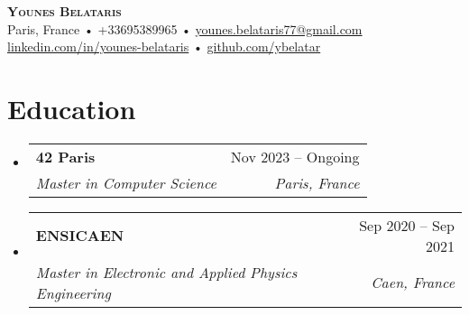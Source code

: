 \documentclass[letterpaper,11pt]{article}
\makeatletter
\newcommand{\resumeItem}[1]{
  \item\small{
    {#1 \vspace{-2pt}}
  }
}
\newcommand{\resumeSubheading}[4]{
  \vspace{-2pt}\item
    \begin{tabular*}{0.97\textwidth}[t]{l@{\extracolsep{\fill}}r}
      \textbf{#1} & #2 \\
      \textit{\small#3} & \textit{\small #4} \\
    \end{tabular*}\vspace{-7pt}
}
\newcommand{\resumeSubHeadingListStart}{\begin{itemize}[leftmargin=0.15in, label={}]}
\newcommand{\resumeSubHeadingListEnd}{\end{itemize}}
\newcommand{\resumeItemListStart}{\begin{itemize}}
\newcommand{\resumeItemListEnd}{\end{itemize}\vspace{-5pt}}
\makeatother
\begin{document}

\begin{center}
    \textbf{\Huge \scshape Younes Belataris} \\ \vspace{6pt}
    \small Paris, France  \hspace{2mm}•\hspace{2mm}   +33695389965   \hspace{2mm}•\hspace{2mm}   \href{younes.belataris77@gmail.com}{{younes.belataris77@gmail.com}} \\
    \href{https://linkedin.com/in/younes-belataris-65752a301}{{linkedin.com/in/younes-belataris}} \hspace{2mm}•\hspace{2mm}
    \href{https://github.com/ybelatar}{{github.com/ybelatar}}
\end{center}


\section{Education}
  \resumeSubHeadingListStart
    \resumeSubheading
      {42 Paris}{Nov 2023 -- Ongoing}
      {Master in Computer Science}{Paris, France}
    \resumeSubheading
      {ENSICAEN}{Sep 2020 -- Sep 2021}
      {Master in Electronic and Applied Physics Engineering}{Caen, France}
  \resumeSubHeadingListEnd



      
\end{document}
